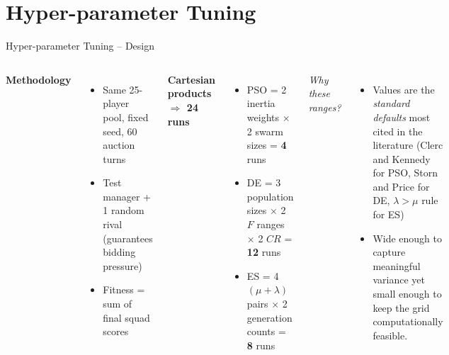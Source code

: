 \documentclass[aspectratio=169]{beamer}
\begin{document}
\section{Hyper-parameter Tuning}
\begin{frame}{Hyper-parameter Tuning – Design}
	\small
	\begin{columns}[T,onlytextwidth]
		\textbf{Methodology}
		\begin{itemize}
			\item Same 25-player pool, fixed seed, 60 auction turns
			\item Test manager + 1 random rival (guarantees bidding pressure)
			\item Fitness = sum of final squad scores
		\end{itemize}
		
		\medskip
		\textbf{Cartesian products \(\Rightarrow\) 24 runs}
\begin{itemize}
	\item PSO = 2 inertia weights \(\times\) 2 swarm sizes = \textbf{4} runs
	\item DE = 3 population sizes \(\times\) 2 \(F\) ranges \(\times\) 2 \(CR\) = \textbf{12} runs
	\item ES = 4 \((\mu+\lambda)\) pairs \(\times\) 2 generation counts = \textbf{8} runs
\end{itemize}

	

\vspace{0.4em}
\textit{Why these ranges?}
\begin{itemize}
	\item Values are the \emph{standard defaults} most cited in the literature  
	(Clerc and Kennedy for PSO, Storn and Price for DE, \(\lambda\!>\!\!\mu\) rule for ES)
	\item Wide enough to capture meaningful variance yet small enough to keep
	the grid computationally feasible.
	
\end{itemize}
	\end{columns}
\end{frame}
\end{document}
